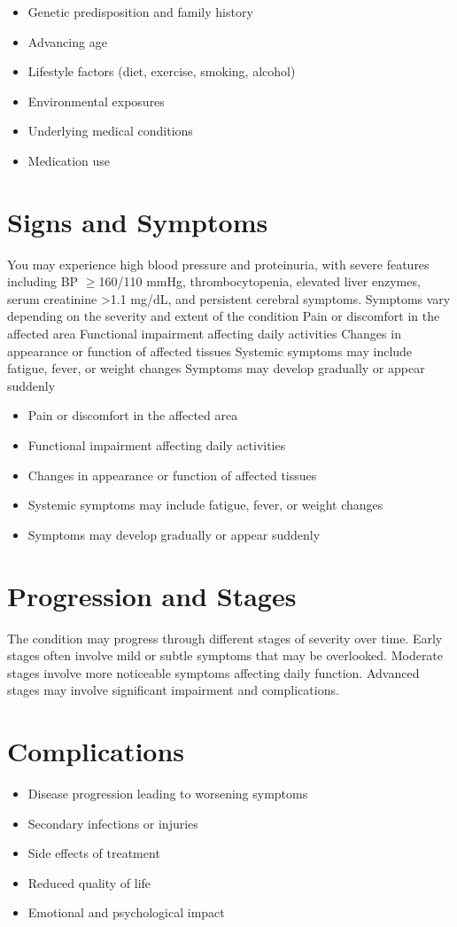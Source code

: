\begin{itemize}[noitemsep]
  \item Genetic predisposition and family history
  \item Advancing age
  \item Lifestyle factors (diet, exercise, smoking, alcohol)
  \item Environmental exposures
  \item Underlying medical conditions
  \item Medication use
\end{itemize}
\section{Signs and Symptoms}
You may experience high blood pressure and proteinuria, with severe features including BP $\ge$160/110 mmHg, thrombocytopenia, elevated liver enzymes, serum creatinine >1.1 mg/dL, and persistent cerebral symptoms. Symptoms vary depending on the severity and extent of the condition Pain or discomfort in the affected area Functional impairment affecting daily activities Changes in appearance or function of affected tissues Systemic symptoms may include fatigue, fever, or weight changes Symptoms may develop gradually or appear suddenly

\begin{itemize}[noitemsep]
  \item Pain or discomfort in the affected area
  \item Functional impairment affecting daily activities
  \item Changes in appearance or function of affected tissues
  \item Systemic symptoms may include fatigue, fever, or weight changes
  \item Symptoms may develop gradually or appear suddenly
\end{itemize}
\section{Progression and Stages}
The condition may progress through different stages of severity over time. Early stages often involve mild or subtle symptoms that may be overlooked. Moderate stages involve more noticeable symptoms affecting daily function. Advanced stages may involve significant impairment and complications.
\section{Complications}
\begin{itemize}[noitemsep]
  \item Disease progression leading to worsening symptoms
  \item Secondary infections or injuries
  \item Side effects of treatment
  \item Reduced quality of life
  \item Emotional and psychological impact
\end{itemize}
